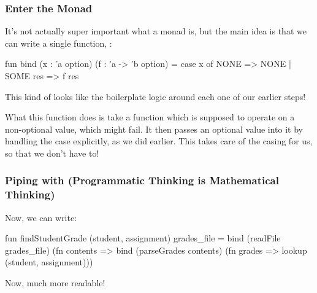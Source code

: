 \documentclass[aspectratio=169]{beamer}
\begin{document}
\begin{frame}[fragile]
  \frametitle{Enter the Monad}


  \vspace{\fill}

  It's not actually super important what a monad is, but the main idea is that we can
  write a single function, :

  \begin{codeblock}
    fun bind (x : 'a option) (f : 'a -> 'b option) = 
      case x of
        NONE => NONE
      | SOME res => f res
  \end{codeblock}

  \vspace{\fill}

  This kind of looks like the boilerplate logic around each one of our earlier steps!

  \vspace{\fill}

  What this function does is take a function which is supposed to operate on a non-optional
  value, which might fail. It then passes an optional value into it by handling the 
   case explicitly, as we did earlier. This takes care of the casing for us,
  so that we don't have to!

  \tgs
\end{frame}

\begin{frame}[fragile]
  \frametitle{Piping with  {(Programmatic Thinking is Mathematical Thinking)}}

  Now, we can write:

  \begin{codeblock}
    fun findStudentGrade (student, assignment) grades_file =
      bind (readFile grades_file) (fn contents =>
      bind (parseGrades contents) (fn grades =>
      lookup (student, assignment)))
  \end{codeblock}

  Now, much more readable!
\end{frame}
\end{document}
